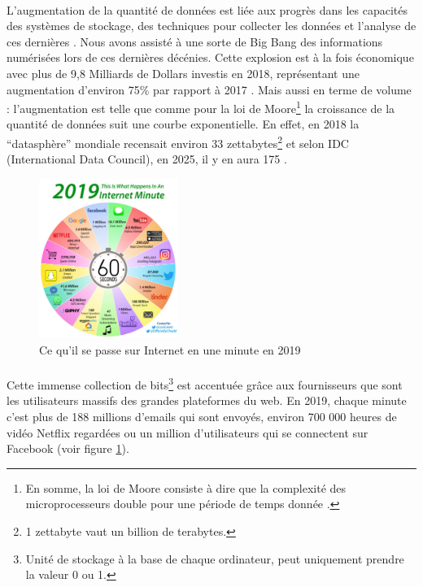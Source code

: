 \documentclass[10pt, french, a4paper]{report}
\begin{document}
\paragraph{}
L'augmentation de la quantité de données est liée aux progrès dans les capacités des systèmes de stockage, des techniques pour collecter les données et l'analyse de ces dernières \citep{press_very_2013}. Nous avons assisté à une sorte de Big Bang des informations numérisées lors de ces dernières décénies. Cette explosion est à la fois économique avec plus de 9,8 Milliards de Dollars investis en 2018, représentant une augmentation d'environ 75\% par rapport à 2017 \citep{columbus_25_2019}. Mais aussi en terme de volume : l'augmentation est telle que comme pour la loi de Moore\footnote{En somme, la loi de Moore consiste à dire que la complexité des microprocesseurs double pour une période de temps donnée \citep{moore_cramming_1998}.} la croissance de la quantité de données suit une courbe exponentielle. En effet, en 2018 la ``datasphère'' mondiale recensait environ 33 zettabytes\footnote{1 zettabyte vaut un billion de terabytes.} et selon IDC (International Data Council), en 2025, il y en aura 175 \citep{reinsel_digitization_2018}.

\begin{figure}[hbt!]
  \centering
  \includegraphics[width=0.4\textwidth]{images/internet-minute-2019.jpg}
  \caption{Ce qu'il se passe sur Internet en une minute en 2019 \citep{desjardins_what_2019}}
  \label{fig:internet_minute_2019}
\end{figure}

\paragraph{}
Cette immense collection de bits\footnote{Unité de stockage à la base de chaque ordinateur, peut uniquement prendre la valeur 0 ou 1.} est accentuée grâce aux fournisseurs que sont les utilisateurs massifs des grandes plateformes du web. En 2019, chaque minute c'est plus de 188 millions d'emails qui sont envoyés, environ 700 000 heures de vidéo Netflix regardées ou un million d'utilisateurs qui se connectent sur Facebook (voir figure \ref{fig:internet_minute_2019}).
\end{document}
